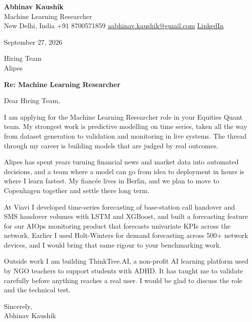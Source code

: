\documentclass[11pt,a4paper]{article}
\begin{document}
{\Large\bfseries Abhinav Kaushik}\\
Machine Learning Researcher\\
New Delhi, India \textbar{} +91 8700571859 \textbar{} \href{mailto:aabhinav.kaushik@gmail.com}{aabhinav.kaushik@gmail.com} \textbar{} \href{https://www.linkedin.com/in/abhinav-kaushik10/}{LinkedIn}  

September 27, 2026

Hiring Team\\
Alipes

\textbf{Re: Machine Learning Researcher}

Dear Hiring Team,

I am applying for the Machine Learning Researcher role in your Equities Quant team. My strongest work is predictive modelling on time series, taken all the way from dataset generation to validation and monitoring in live systems. The thread through my career is building models that are judged by real outcomes.

Alipes has spent years turning financial news and market data into automated decisions, and a team where a model can go from idea to deployment in hours is where I learn fastest. My fiancée lives in Berlin, and we plan to move to Copenhagen together and settle there long term.

At Viavi I developed time-series forecasting of base-station call handover and SMS handover volumes with LSTM and XGBoost, and built a forecasting feature for our AIOps monitoring product that forecasts univariate KPIs across the network. Earlier I used Holt-Winters for demand forecasting across 500+ network devices, and I would bring that same rigour to your benchmarking work.

Outside work I am building ThinkTree.AI, a non-profit AI learning platform used by NGO teachers to support students with ADHD. It has taught me to validate carefully before anything reaches a real user. I would be glad to discuss the role and the technical test.

Sincerely,\\[4pt]
Abhinav Kaushik
\end{document}
